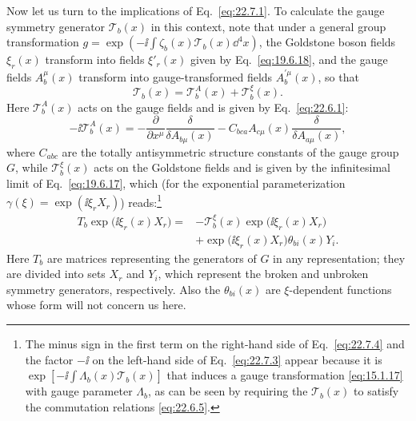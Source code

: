 Now let us turn to the implications of Eq.~\eqref{eq:22.7.1}. To
calculate the gauge symmetry generator $\mathcal T_b(x)$ in this
context, note that under a general group transformation
$g=\exp(-\ii\int\zeta_b(x)\mathcal T_b(x)\dd^4x)$, the Goldstone
boson fields $\xi_r(x)$ transform into fields $\xi'_r(x)$ given by
Eq.~\eqref{eq:19.6.18}, and the gauge fields $A^\mu_b(x)$ transform
into gauge-transformed fields $A^{\prime\mu}_b(x)$, so that
\begin{equation}
 \mathcal T_b(x)=\mathcal T_b^A(x)+\mathcal T_b^\xi(x).
 \tag{22.7.2}\label{eq:22.7.2}
\end{equation}
Here $\mathcal T_b^A(x)$ acts on the gauge fields and is given by
Eq.~\eqref{eq:22.6.1}:
\begin{equation}
 -\ii\mathcal T_b^A(x)
 =-\frac{\partial}{\partial x^\mu}
 \frac{\delta}{\delta A_{b\mu}(x)}
 -C_{bca}A_{c\mu}(x)
 \frac{\delta}{\delta A_{a\mu}(x)},
 \tag{22.7.3}\label{eq:22.7.3}
\end{equation}
where $C_{abc}$ are the totally antisymmetric structure
constants of the gauge group $G$, while $\mathcal T_b^\xi(x)$ acts
on the Goldstone fields and is given by the infinitesimal limit of
Eq.~\eqref{eq:19.6.17}, which (for the exponential parameterization
$\gamma(\xi)=\exp(\ii\xi_rX_r)$) reads:\footnote{The minus sign in the
first term on the right-hand side of Eq.~\eqref{eq:22.7.4} and the
factor $-\ii$ on the left-hand side of Eq.~\eqref{eq:22.7.3} appear
because it is
$\exp[-\ii\int\Lambda_b(x)\mathcal T_b(x)]$ that induces a gauge
transformation \eqref{eq:15.1.17} with gauge parameter $\Lambda_b$,
as can be seen by requiring the $\mathcal T_b(x)$ to satisfy the
commutation relations \eqref{eq:22.6.5}.}
\begin{equation}
 \begin{aligned}
 T_b\exp\bigl(\ii\xi_r(x)X_r\bigr)
 ={}&-\mathcal T_b^\xi(x)\exp\bigl(\ii\xi_r(x)X_r\bigr)
 \\
 &+\exp\bigl(\ii\xi_r(x)X_r\bigr)\theta_{b i}(x)Y_i.
 \end{aligned}
 \tag{22.7.4}\label{eq:22.7.4}
\end{equation}
Here $T_b$ are matrices representing the generators of $G$ in any
representation; they are divided into sets $X_r$ and $Y_i$, which
represent the broken and unbroken symmetry generators, respectively.
Also the $\theta_{b i}(x)$ are $\xi$-dependent functions whose form
will not concern us here.

